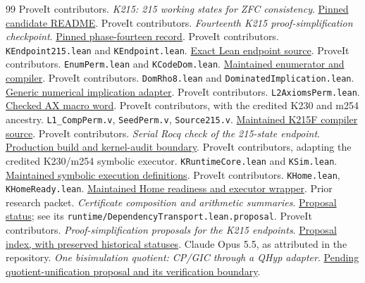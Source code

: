 \documentclass[11pt]{article}
\theoremstyle{definition}\newtheorem{definition}[theorem]{Definition}
\newcommand{\code}[1]{\texttt{#1}}
\newcommand{\repo}{https://github.com/VladimirReshetnikov/ProveIt/blob/6d9800d1ca67c52db0eb6e1c65df7b5cab9cdb95/}
\begin{document}
\begin{thebibliography}{99}\small
{} ProveIt contributors. \emph{K215: 215 working states for ZFC consistency}.
\href{\repo Computability/BusyBeaver/Research/ZFC/candidate-k215/README.md}{Pinned candidate README}.
 ProveIt contributors. \emph{Fourteenth K215 proof-simplification checkpoint}.
\href{\repo Computability/BusyBeaver/Research/ZFC/k225-formal/verification/k215/simplification/phase14/README.md}{Pinned phase-fourteen record}.
 ProveIt contributors. \code{KEndpoint215.lean} and \code{KEndpoint.lean}.
\href{\repo Computability/BusyBeaver/Lean/BusyBeaver/ZFC/KEndpoint215.lean}{Exact Lean endpoint source}.
 ProveIt contributors. \code{EnumPerm.lean} and \code{KCodeDom.lean}.
\href{\repo Computability/BusyBeaver/Lean/BusyBeaver/ZFC/EnumPerm.lean}{Maintained enumerator and compiler}.
 ProveIt contributors. \code{DomRho8.lean} and \code{DominatedImplication.lean}.
\href{\repo Computability/BusyBeaver/Lean/BusyBeaver/ZFC/DomRho8.lean}{Generic numerical implication adapter}.
 ProveIt contributors. \code{L2AxiomsPerm.lean}.
\href{\repo Computability/BusyBeaver/Lean/BusyBeaver/ZFC/L2AxiomsPerm.lean}{Checked AX macro word}.
 ProveIt contributors, with the credited K230 and m254 ancestry.
\code{L1\_CompPerm.v}, \code{SeedPerm.v}, \code{Source215.v}.
\href{\repo Computability/BusyBeaver/Research/ZFC/k225-formal/rocq/rocq-extension/coq/215/L1_CompPerm.v}{Maintained K215F compiler source}.
 ProveIt contributors. \emph{Serial Rocq check of the 215-state endpoint}.
\href{\repo Computability/BusyBeaver/Research/ZFC/k225-formal/verification/k215/rocq/README.md}{Production build and kernel-audit boundary}.
 ProveIt contributors, adapting the credited K230/m254 symbolic executor.
\code{KRuntimeCore.lean} and \code{KSim.lean}.
\href{\repo Computability/BusyBeaver/Lean/BusyBeaver/ZFC/KRuntimeCore.lean}{Maintained symbolic execution definitions}.
 ProveIt contributors. \code{KHome.lean}, \code{KHomeReady.lean}.
\href{\repo Computability/BusyBeaver/Lean/BusyBeaver/ZFC/KHomeReady.lean}{Maintained Home readiness and executor wrapper}.
 Prior research packet. \emph{Certificate composition and arithmetic summaries}.
\href{\repo Computability/BusyBeaver/Research/ZFC/k225-formal/verification/k215/simplification/proposals/rocq-composition/README.md}{Proposal status}; see its
\code{runtime/DependencyTransport.lean.proposal}.
 ProveIt contributors. \emph{Proof-simplification proposals for the K215 endpoints}.
\href{\repo Computability/BusyBeaver/Research/ZFC/k225-formal/verification/k215/simplification/proposals/README.md}{Proposal index, with preserved historical statuses}.
 Claude Opus 5.5, as attributed in the repository. \emph{One bisimulation quotient: CP/GIC through a QHyp adapter}.
\href{\repo Computability/BusyBeaver/Research/ZFC/k225-formal/verification/k215/simplification/proposals/quotient-unification/README.md}{Pending quotient-unification proposal and its verification boundary}.
\end{thebibliography}
\end{document}
